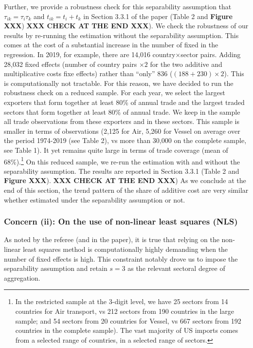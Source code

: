\documentclass[a4paper,11pt]{article}
\begin{document}
Further, we provide a robustness check for this separability assumption that $\tau_{ik} = \tau_i\tau_{k}$ and
 $t_{ik} = t_i +t_k$ in Section 3.3.1 of the paper (Table 2 and \textbf{Figure XXX}) \textbf{XXX CHECK AT THE END XXX}). We check the robustness of our results by re-running the estimation without the separability assumption. This comes at the cost of a substantial increase in the number of fixed in the regression. In 2019, for example, there are 14,016 country$\times$sector pairs. Adding 28,032 fixed effects (number of country pairs $\times2$ for the two additive and multiplicative costs fixe effects) rather than ``only'' 836 ($(188+230)\times 2$). This is computationally not tractable.
 For this reason, we have decided to run the robustness check on a reduced sample. For each year, we select the largest exporters that form together at least 80\% of annual trade and the largest traded sectors that form together at least 80\% of annual trade.
 We keep in the sample all trade observations from these exporters and in these sectors.
 This sample is smaller in terms of observations (2,125 for Air, 5,260 for Vessel on average over the period 1974-2019 (see Table 2), vs more than 30,000 on the complete sample, see Table 1). It yet remains quite large in terms of trade coverage (mean of 68\%).\footnote{In the restricted sample at the 3-digit level, we have 25 sectors from 14 countries for Air transport, vs 212 sectors from 190 countries in the large sample; and 54 sectors from 20 countries for Vessel, vs 667 sectors from 192 countries in the complete sample). The vast majority of US imports comes from a selected range of countries, in a selected range of sectors.} On this reduced sample, we re-run the estimation with and without the separability assumption. The results are reported in Section 3.3.1 (Table 2 and \textbf{Figure XXX}). \textbf{XXX CHECK AT THE END XXX}) As we conclude at the end of this section, the trend pattern of the share of additive cost are very similar whether estimated under the separability assumption or not.


\subsubsection{Concern (ii): On the use of non-linear least squares (NLS)} As noted by the referee (and in the paper), it is true that relying on the non-linear least squares method is computationally highly demanding when the number of fixed effects is high. This constraint notably drove us to impose the separability assumption and retain $s=3$ as the relevant sectoral degree of aggregation.
\end{document}
